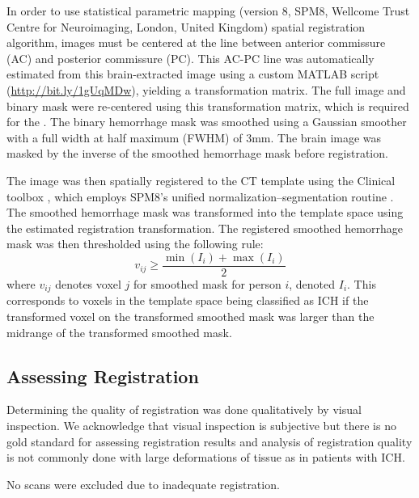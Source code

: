 \documentclass[10pt]{article}\usepackage[]{graphicx}\usepackage[]{color}
\begin{document}
In order to use statistical parametric mapping (version 8, SPM8, Wellcome Trust Centre for Neuroimaging, London, United Kingdom) spatial registration algorithm, images must be centered at the line between anterior commissure (AC) and posterior commissure (PC).  This AC-PC line was automatically estimated from this brain-extracted image using a custom MATLAB script (\url{http://bit.ly/1gUqMDw}), yielding a transformation matrix. 
The full image and binary mask were re-centered using this transformation matrix, which is required for the .  The binary hemorrhage mask was smoothed using a Gaussian smoother with a full width at half maximum (FWHM) of $3$mm.  The brain image was masked by the inverse of the smoothed hemorrhage mask before registration. 


The image was then spatially registered to the CT template using the Clinical toolbox \citep{rorden_age-specific_2012}, which employs SPM8's unified normalization–segmentation routine \citep{ashburner_unified_2005}.  The smoothed hemorrhage mask was transformed into the template space using the estimated registration transformation.  The registered smoothed hemorrhage mask was then thresholded using the following rule:
$$
v_{ij} ≥ \frac{\min(I_i) + \max(I_i)}{2}
$$
where $v_{ij}$ denotes voxel $j$ for smoothed mask for person $i$, denoted $I_i$.  This corresponds to voxels in the template space being classified as ICH if the transformed voxel on the transformed smoothed mask was larger than the midrange of the transformed smoothed mask.  


\subsection*{Assessing Registration}

Determining the quality of registration was done qualitatively by visual inspection.   We acknowledge that visual inspection is subjective but there is no gold standard for assessing
registration results and analysis of registration quality is not commonly done with large deformations of tissue as in patients with ICH.  

No scans were excluded due to inadequate registration.
\end{document}
